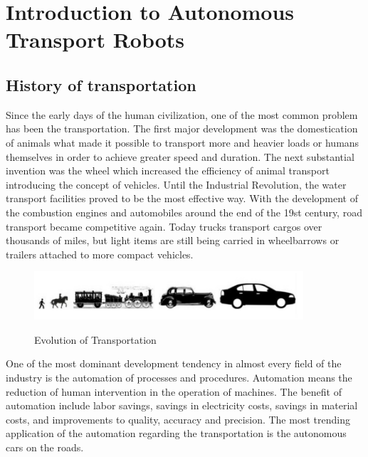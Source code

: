\documentclass[12pt,english]{article}
\begin{document}

\newpage
\section{Introduction to Autonomous Transport Robots}
\subsection{History of transportation}

Since the early days of the human civilization, one of the most common problem has been the transportation. The first major development was the domestication of animals what made it possible to transport more and heavier loads or humans themselves in order to achieve greater speed and duration. The next substantial invention was the wheel which increased the efficiency of animal transport introducing the concept of vehicles. Until the Industrial Revolution, the water transport facilities proved to be the most effective way. With the development of the combustion engines and automobiles around the end of the 19st century, road transport became competitive again. Today trucks transport cargos over thousands of miles, but light items are still being carried in wheelbarrows or trailers attached to more compact vehicles. 

\begin{figure}[h]
	\centering
	\includegraphics[width=10cm]{evot}
	\label{fig1}
	\caption{Evolution of Transportation}
\end{figure}

\noindent One of the most dominant development tendency in almost every field of the industry is the automation of processes and procedures. Automation means the reduction of human intervention in the operation of machines. The benefit of automation include labor savings, savings in electricity costs, savings in material costs, and improvements to quality, accuracy and precision. The most trending application of the automation regarding the transportation is the autonomous cars on the roads. 
\end{document}
